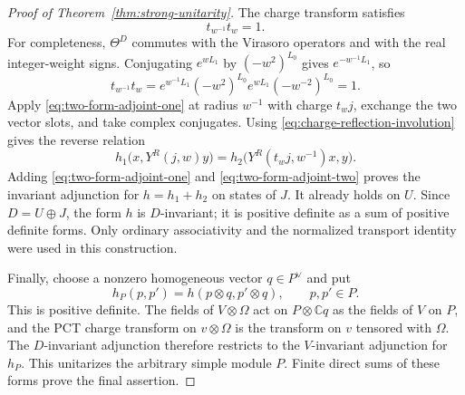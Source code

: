 \begin{proof}[Proof of Theorem~\ref{thm:strong-unitarity}]
The charge transform satisfies
\begin{equation}\label{eq:charge-reflection-involution}
 t_{w^{-1}}t_w=1.
\end{equation}
For completeness, $\Theta^D$ commutes with the Virasoro operators and
with the real integer-weight signs. Conjugating $e^{wL_1}$ by
$(-w^2)^{L_0}$ gives $e^{-w^{-1}L_1}$, so
\[
 t_{w^{-1}}t_w
 =e^{w^{-1}L_1}(-w^2)^{L_0}
   e^{wL_1}(-w^{-2})^{L_0}
 =1.
\]
Apply \eqref{eq:two-form-adjoint-one} at radius $w^{-1}$ with charge
$t_wj$, exchange the two vector slots, and take complex conjugates.
Using \eqref{eq:charge-reflection-involution} gives the reverse relation
\begin{equation}\label{eq:two-form-adjoint-two}
 h_1\bigl(x,Y^R(j,w)y\bigr)
 =h_2\bigl(Y^R(t_wj,w^{-1})x,y\bigr).
\end{equation}
Adding \eqref{eq:two-form-adjoint-one} and
\eqref{eq:two-form-adjoint-two} proves the invariant adjunction for
$h=h_1+h_2$ on states of $J$. It already holds on $U$. Since
$D=U\oplus J$, the form $h$ is $D$-invariant; it is positive definite
as a sum of positive definite forms. Only ordinary associativity and
the normalized transport identity were used in this construction.

Finally, choose a nonzero homogeneous vector $q\in P^\vee$ and put
\[
 h_P(p,p')=h(p\otimes q,p'\otimes q),\qquad p,p'\in P.
\]
This is positive definite. The fields of $V\otimes\Omega$ act on
$P\otimes\mathbb Cq$ as the fields of $V$ on $P$, and the PCT charge
transform on $v\otimes\Omega$ is the transform on $v$ tensored with
$\Omega$. The $D$-invariant adjunction therefore restricts to the
$V$-invariant adjunction for $h_P$. This unitarizes the arbitrary
simple module $P$. Finite direct sums of these forms prove the final
assertion.
\end{proof}

